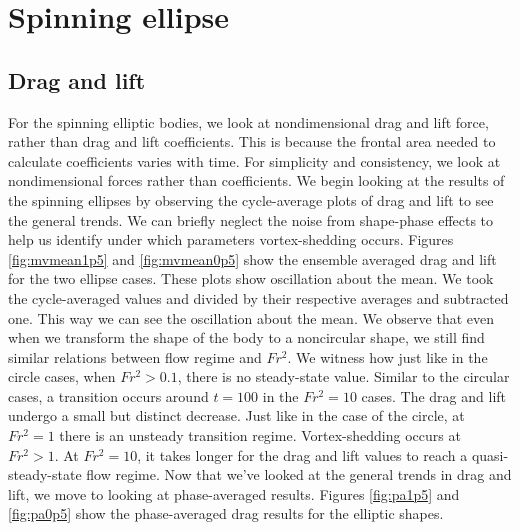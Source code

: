\section{Spinning ellipse}
\label{section:Spinning_ellipse}
\subsection{Drag and lift}
For the spinning elliptic bodies, we look at nondimensional drag and lift force, rather than drag and lift coefficients. This is because the frontal area needed to calculate coefficients varies with time. For simplicity and consistency, we look at nondimensional forces rather than coefficients. We begin looking at the results of the spinning ellipses by observing the cycle-average plots of drag and lift to see the general trends. We can briefly neglect the noise from shape-phase effects to help us identify under which parameters vortex-shedding occurs. Figures \ref{fig:mvmean1p5} and \ref{fig:mvmean0p5} show the ensemble averaged drag and lift for the two ellipse cases. These plots show oscillation about the mean. We took the cycle-averaged values and divided by their respective averages and subtracted one. This way we can see the oscillation about the mean. We observe that even when we transform the shape of the body to a noncircular shape, we still find similar relations between flow regime and $Fr^2$. We witness how just like in the circle cases, when $Fr^2 > 0.1$, there is no steady-state value. Similar to the circular cases, a transition occurs around $t = 100$ in the $Fr^2 = 10$ cases. The drag and lift undergo a small but distinct decrease. Just like in the case of the circle, at $Fr^2 = 1$ there is an unsteady transition regime. Vortex-shedding occurs at $Fr^2 > 1$. At $Fr^2 = 10$, it takes longer for the drag and lift values to reach a quasi-steady-state flow regime. Now that we've looked at the general trends in drag and lift, we move to looking at phase-averaged results. Figures \ref{fig:pa1p5} and \ref{fig:pa0p5} show the phase-averaged drag results for the elliptic shapes. \\
